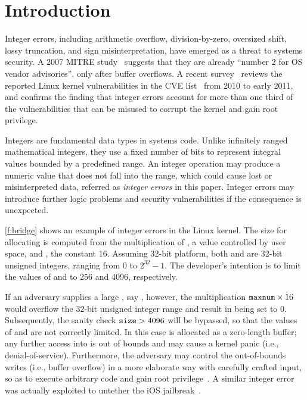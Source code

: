 \section{Introduction}
\label{s:intro}

Integer errors, including arithmetic overflow, division-by-zero,
oversized shift, lossy truncation, and sign misinterpretation, have
emerged as a threat to systems security.  A 2007 MITRE
study~\cite{christey:vuln} suggests that they are already ``number
2 for OS vendor advisories'', only after buffer overflows.  A recent
survey~\cite{chen:kbugs} reviews the reported Linux kernel
vulnerabilities in the CVE list~\cite{cve} from 2010 to early 2011,
and confirms the finding that integer errors account for more than
one third of the vulnerabilities that can be misused to corrupt the
kernel and gain root privilege.

Integers are fundamental data types in systems code.  Unlike
infinitely ranged mathematical integers, they use a fixed number
of bits to represent integral values bounded by a predefined range.
An integer operation may produce a numeric value that does not fall
into the range, which could cause lost or misinterpreted data, referred
as \emph{integer errors} in this paper.  Integer errors may introduce
further logic problems and security vulnerabilities if the consequence
is unexpected.
\fi

\autoref{f:bridge} shows an example of integer errors in the Linux
kernel.  The size for allocating  is computed from the
multiplication of , a value controlled by user space,
and , the constant 16.  Assuming
32-bit platform, both  and  are 32-bit unsigned
integers, ranging from 0 to $2^{32} - 1$.
The developer's intention is to limit the values of 
 and  to 256 and 4096, respectively.

If an adversary supplies a large , say
, however, the multiplication $\texttt{maxnum} \times 16$ would
overflow the 32-bit unsigned integer range and result in 
being set to 0.  Subsequently, the sanity check $\texttt{size} > 4096$
will be bypassed, so that the values of  and 
are not correctly limited.  In this case  is allocated as
a zero-length buffer; any further access into  is out of
bounds and may cause a kernel panic (i.e., denial-of-service).
Furthermore, the adversary may control the out-of-bounds writes
(i.e., buffer overflow) in a more elaborate way with carefully
crafted input, so as to execute arbitrary code and gain root
privilege~\cite[CVE-2006-5751]{cve}.  A similar integer error was
actually exploited to untether the iOS jailbreak~\cite{esser:ios}.

